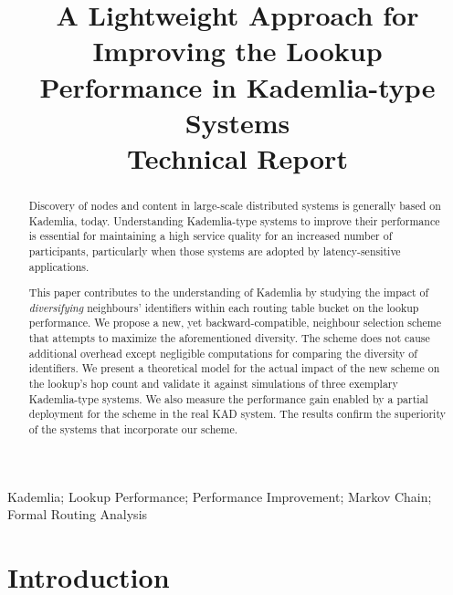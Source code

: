 \documentclass[10pt, conference, compsocconf, letterpaper]{IEEEtran}
\begin{document}
\title{A Lightweight Approach for Improving the Lookup Performance in Kademlia-type Systems \\ \vspace{5mm} \LARGE{Technical Report}}


\author{
}



\maketitle
\begin{abstract}
Discovery of nodes and content in large-scale distributed systems is generally based on Kademlia, today. Understanding Kademlia-type systems to improve their performance is essential for maintaining a high service quality for an increased number of participants, particularly when those systems are adopted by latency-sensitive applications.

This paper contributes to the understanding of Kademlia by studying the impact of \emph{diversifying} neighbours' identifiers within each routing table bucket on the lookup performance. We propose a new, yet backward-compatible, neighbour selection scheme that attempts to maximize the aforementioned diversity. The scheme does not cause additional overhead except negligible computations for comparing the diversity of identifiers. We present a theoretical model for the actual impact of the new scheme on the lookup's hop count and validate it against simulations of three exemplary Kademlia-type systems. We also measure the performance gain enabled by a partial deployment for the scheme in the real KAD system. The results confirm the superiority of the systems that incorporate our scheme.\\
\end{abstract}
\begin{keywords}
Kademlia; Lookup Performance; Performance Improvement; Markov Chain; Formal Routing Analysis
\end{keywords}
\IEEEpeerreviewmaketitle



\section{Introduction} \label{sec:intro}
\end{document}
